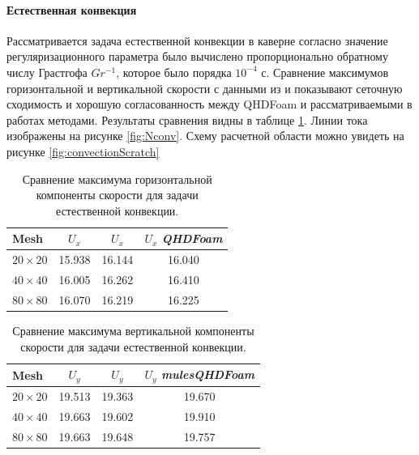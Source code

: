 \paragraph{Естественная конвекция}

Рассматривается задача естественной конвекции в каверне согласно \cite{ElizarBook} значение регуляризационного параметра было вычислено пропорционально обратному числу Грастгофа $Gr^{-1}$, которое было порядка $10^{-4}$ с. Сравнение максимумов горизонтальной и вертикальной скорости с данными из \cite{ElizarBook} и \cite{Vabishevich} показывают сеточную сходимость и хорошую согласованность между QHDFoam и рассматриваемыми в работах методами. Результаты сравнения видны в таблице \ref{table:tabHotCavityHor}. Линии тока изображены на рисунке \ref{fig:Nconv}. Схему расчетной области можно увидеть на рисунке \ref{fig:convectionScratch}

\begin{table}[!hb]
\caption { Сравнение максимума горизонтальной компоненты скорости для задачи естественной конвекции.}
\centering
\noindent\begin{tabular}{l|ccc}
Mesh & $U_x$ \cite{ElizarBook} & $U_x$ \cite{Vabishevich} & $U_x$ \textit{QHDFoam} \\
\hline
$20\times20$ & 15.938 & 16.144 & 16.040\\
$40\times40$ & 16.005 & 16.262 & 16.410\\
$80\times80$ & 16.070 & 16.219 & 16.225
\end{tabular}
\label{table:tabHotCavityHor}
\end{table}

 \begin{table}[!h]
\centering
\caption {Сравнение максимума вертикальной компоненты скорости для задачи естественной конвекции.}
\noindent\begin{tabular}{l|ccc}
Mesh & $U_y$ \cite{ElizarBook} & $U_y$ \cite{Vabishevich} & $U_y$ \textit{mulesQHDFoam} \\
\hline
$20\times20$ & 19.513 & 19.363 & 19.670\\
$40\times40$ & 19.663 & 19.602 & 19.910\\
$80\times80$ & 19.663 & 19.648 & 19.757
\end{tabular}
\label{table:tabHotCavityVer}
\end{table}

